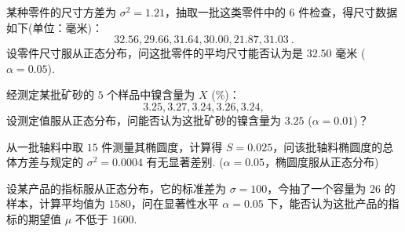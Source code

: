 	\begin{titwo}
		某种零件的尺寸方差为 $\sigma^{2} = 1.21$，抽取一批这类零件中的 $6$ 件检查，得尺寸数据如下(单位：毫米)：
		\[
			32.56,29.66,31.64,30.00,21.87,31.03~.
		\]
		设零件尺寸服从正态分布，问这批零件的平均尺寸能否认为是 $32.50$ 毫米 ($\alpha = 0.05$).
	\end{titwo}

	\begin{titwo}
		经测定某批矿砂的 $5$ 个样品中镍含量为 $X$ (\si{\percent})：
		\[
			3.25,3.27,3.24,3.26,3.24,
		\]
		设测定值服从正态分布，问能否认为这批矿砂的镍含量为 $3.25$ ($\alpha = 0.01$)？
	\end{titwo}

	\begin{titwo}
		从一批轴料中取 $15$ 件测量其椭圆度，计算得 $S = 0.025$，问该批轴料椭圆度的总体方差与规定的 $\sigma^{2} = 0.0004$ 有无显著差别. ($\alpha = 0.05$，椭圆度服从正态分布)
	\end{titwo}

	\begin{titwo}
		设某产品的指标服从正态分布，它的标准差为 $\sigma = 100$，今抽了一个容量为 $26$ 的样本，计算平均值为 $1580$，问在显著性水平 $\alpha = 0.05$ 下，能否认为这批产品的指标的期望值 $\mu$ 不低于 $1600$.
    \end{titwo}
    \guanggao\newpage\guanggao